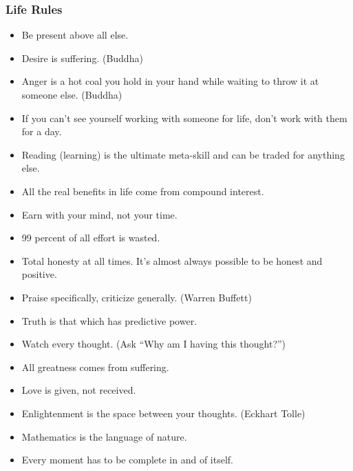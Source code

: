 \begin{frame}[fragile]\frametitle{Life Rules}

	\begin{itemize}
\item Be present above all else. 
\item Desire is suffering. (Buddha) 
\item Anger is a hot coal you hold in your hand while waiting to throw it at someone else. (Buddha) 
\item If you can't see yourself working with someone for life, don't work with them for a day. 
\item Reading (learning) is the ultimate meta-skill and can be traded for anything else. 
\item All the real benefits in life come from compound interest. 
\item Earn with your mind, not your time. 
\item 99 percent of all effort is wasted. 
\item Total honesty at all times. It's almost always possible to be honest and positive. 
\item Praise specifically, criticize generally. (Warren Buffett) 
\item Truth is that which has predictive power. 
\item Watch every thought. (Ask ``Why am I having this thought?'') 
\item All greatness comes from suffering. 
\item Love is given, not received. 
\item Enlightenment is the space between your thoughts. (Eckhart Tolle) 
\item Mathematics is the language of nature. 
\item Every moment has to be complete in and of itself.
	\end{itemize}

\end{frame}


